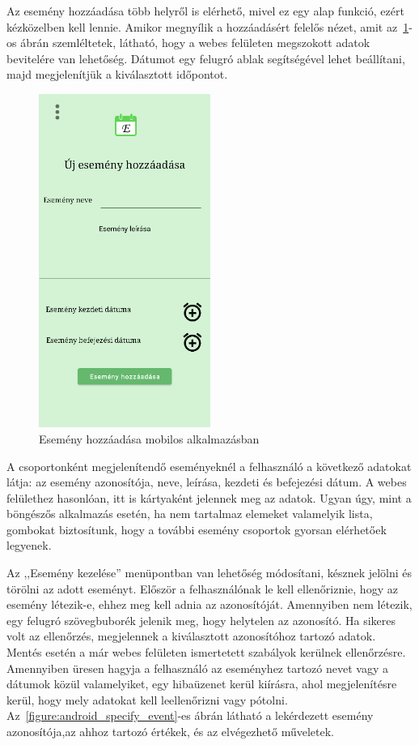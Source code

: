 \documentclass[
]{thesis-ekf}
\theoremstyle{definition}
\theoremstyle{remark}
\begin{document}
	Az esemény hozzáadása több helyről is elérhető, mivel ez egy alap funkció, ezért kézközelben kell lennie. Amikor megnyílik a hozzáadásért felelős nézet, amit az~\ref{figure:androidapp_add_event}-os ábrán szemléltetek, látható, hogy a webes felületen megszokott adatok bevitelére van lehetőség. Dátumot egy felugró ablak segítségével lehet beállítani, majd megjelenítjük a kiválasztott időpontot. 
	
	\begin{figure}[ht!]
		\centering
		\includegraphics[width=0.5\textwidth]{android_app/android_add_event}
		\caption{Esemény hozzáadása mobilos alkalmazásban}
		\label{figure:androidapp_add_event}
	\end{figure}
	
	A csoportonként megjelenítendő eseményeknél a felhasználó a következő adatokat látja: az esemény azonosítója, neve, leírása, kezdeti és befejezési dátum. A webes felülethez hasonlóan, itt is kártyaként jelennek meg az adatok. Ugyan úgy, mint a böngészős alkalmazás esetén, ha nem tartalmaz elemeket valamelyik lista, gombokat biztosítunk, hogy a további esemény csoportok gyorsan elérhetőek legyenek.
	
	Az ,,Esemény kezelése'' menüpontban van lehetőség módosítani, késznek jelölni és törölni az adott eseményt. Először a felhasználónak le kell ellenőriznie, hogy az esemény létezik-e, ehhez meg kell adnia az azonosítóját. Amennyiben nem létezik, egy felugró szövegbuborék jelenik meg, hogy helytelen az azonosító. Ha sikeres volt az ellenőrzés, megjelennek a kiválasztott azonosítóhoz tartozó adatok. Mentés esetén a már webes felületen ismertetett szabályok kerülnek ellenőrzésre. Amennyiben üresen hagyja a felhasználó az eseményhez tartozó nevet vagy a dátumok közül valamelyiket, egy hibaüzenet kerül kiírásra, ahol megjelenítésre kerül, hogy mely adatokat kell leellenőrizni vagy pótolni. Az~\ref{figure:android_specify_event}-es ábrán látható a lekérdezett esemény azonosítója,az ahhoz tartozó értékek, és az elvégezhető műveletek.
	
\end{document}

